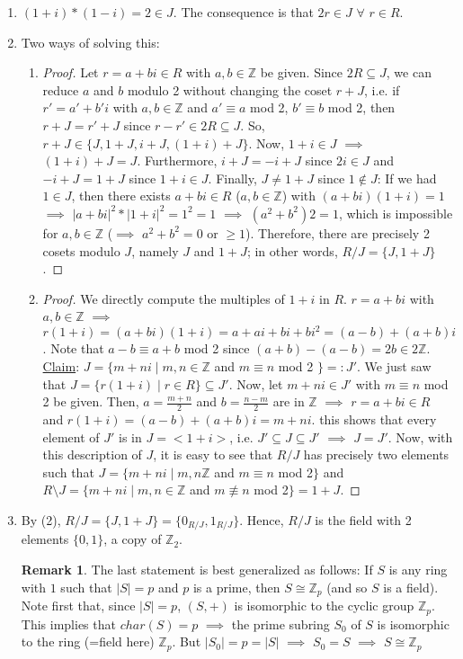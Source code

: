 \documentclass[11pt]{article}
\theoremstyle{definition}
\newtheorem{rem}[thm]{Remark}
\numberwithin{equation}{section}
\newcommand{\Z}{\mathbb{Z}}
\begin{document}
\begin{enumerate}
    \item $(1+i)*(1-i) = 2 \in J$. The consequence is that $2r \in J$ $\forall$ $r \in R$.
    \item Two ways of solving this:
\begin{enumerate}
    \item \begin{proof} Let $r = a+bi \in R$ with $a, b \in \Z$ be given. Since $2R \subseteq J$, we can reduce $a$ and $b$ modulo 2 without changing the coset $r+J$, i.e. if $r' = a'+b'i$ with $a, b \in \Z$ and $a' \equiv a$ mod 2, $b' \equiv b$ mod 2, then $r+J = r'+J$ since $r-r' \in 2R \subseteq J$. So, $r+J \in \{J, 1+J, i+J, (1+i)+J\}$. Now, $1+i \in J$ $\implies$ $(1+i)+ J = J$. Furthermore, $i+J = -i+J$ since $2i \in J$ and $-i+J = 1+J$ since $1+i \in J$. Finally, $J \neq 1+J$ since $1 \notin J$: If we had $1 \in J$, then there exists $a+bi \in R$ ($a, b \in \Z$) with $(a+bi)(1+i) = 1$ $\implies$ $|a+bi|^{2}*|1+i|^{2} = 1^{2} = 1$ $\implies$ $(a^{2}+b^{2})2 = 1$, which is impossible for $a, b \in \Z$ ($\implies$ $a^{2} + b^{2} = 0$ or $\geq 1$). Therefore, there are precisely 2 cosets modulo $J$, namely $J$ and $1+J$; in other words, $R/J = \{J, 1+J\}$.
    \end{proof}
    \item \begin{proof} We directly compute the multiples of $1+i$ in $R$. $r = a+bi$ with $a, b \in \Z$ $\implies$ $r(1+i) = (a+bi)(1+i) = a+ai+bi+bi^{2} = (a-b)+(a+b)i$. Note that $a-b \equiv a+b$ mod 2 since $(a+b)-(a-b) = 2b \in 2\Z$.\\
    \underline{Claim}: $J = \{m+ni \mid m, n \in \Z$ and $m \equiv n$ mod 2 $\} =: J'$. We just saw that $J = \{r(1+i) \mid r \in R\} \subseteq J'$. Now, let $m+ni \in J'$ with $m \equiv n$ mod 2 be given. Then, $a = \frac{m+n}{2}$ and $b = \frac{n-m}{2}$ are in $\Z$ $\implies$ $r = a+bi \in R$ and $r(1+i) = (a-b)+(a+b)i = m+ni$. this shows that every element of $J'$ is in $J = <1+i>$, i.e. $J' \subseteq J \subseteq J'$ $\implies$ $J = J'$. Now, with this description of $J$, it is easy to see that $R/J$ has precisely two elements such that $J = \{m+ni \mid m, n \Z$ and $m \equiv n$ mod 2$\}$ and $R \setminus J = \{m+ni \mid m, n \in \Z$ and $m \not\equiv n$ mod 2$\} = 1+J$.
    \end{proof}
\end{enumerate}
    \item By (2), $R/J = \{J, 1+J\} = \{0_{R/J}, 1_{R/J}\}$. Hence, $R/J$ is the field with 2 elements $\{0, 1\}$, a copy of $\Z_{2}$.
    \begin{rem}
    The last statement is best generalized as follows: If $S$ is any ring with $1$ such that $|S| = p$ and $p$ is a prime, then $S \cong \Z_{p}$ (and so $S$ is a field). Note first that, since $|S| = p$, $(S, +)$ is isomorphic to the cyclic group $\Z_{p}$. This implies that \underline{$char(S) = p$} $\implies$ the prime subring $S_{0}$ of $S$ is isomorphic to the ring (=field here) $\Z_{p}$. But $|S_{0}| = p = |S|$ $\implies$ $S_{0} = S$ $\implies$ $S \cong \Z_{p}$
    \end{rem}
\end{enumerate}
\end{document}
